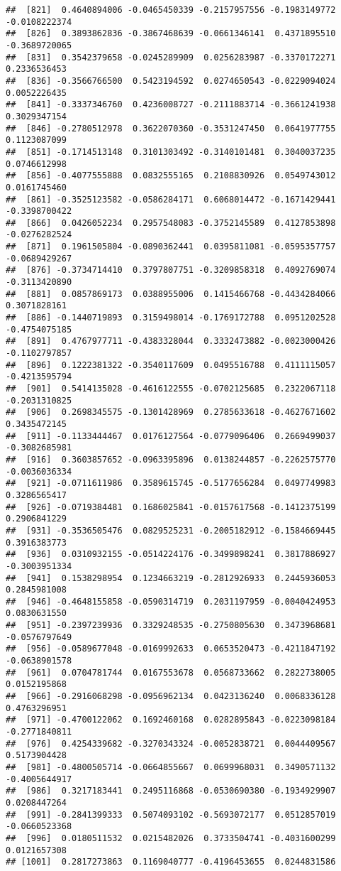 \documentclass[
]{article}
\begin{document}
\begin{verbatim}
##  [821]  0.4640894006 -0.0465450339 -0.2157957556 -0.1983149772 -0.0108222374
##  [826]  0.3893862836 -0.3867468639 -0.0661346141  0.4371895510 -0.3689720065
##  [831]  0.3542379658 -0.0245289909  0.0256283987 -0.3370172271  0.2336536453
##  [836] -0.3566766500  0.5423194592  0.0274650543 -0.0229094024  0.0052226435
##  [841] -0.3337346760  0.4236008727 -0.2111883714 -0.3661241938  0.3029347154
##  [846] -0.2780512978  0.3622070360 -0.3531247450  0.0641977755  0.1123087099
##  [851] -0.1714513148  0.3101303492 -0.3140101481  0.3040037235  0.0746612998
##  [856] -0.4077555888  0.0832555165  0.2108830926  0.0549743012  0.0161745460
##  [861] -0.3525123582 -0.0586284171  0.6068014472 -0.1671429441 -0.3398700422
##  [866]  0.0426052234  0.2957548083 -0.3752145589  0.4127853898 -0.0276282524
##  [871]  0.1961505804 -0.0890362441  0.0395811081 -0.0595357757 -0.0689429267
##  [876] -0.3734714410  0.3797807751 -0.3209858318  0.4092769074 -0.3113420890
##  [881]  0.0857869173  0.0388955006  0.1415466768 -0.4434284066  0.3071828161
##  [886] -0.1440719893  0.3159498014 -0.1769172788  0.0951202528 -0.4754075185
##  [891]  0.4767977711 -0.4383328044  0.3332473882 -0.0023000426 -0.1102797857
##  [896]  0.1222381322 -0.3540117609  0.0495516788  0.4111115057 -0.4213595794
##  [901]  0.5414135028 -0.4616122555 -0.0702125685  0.2322067118 -0.2031310825
##  [906]  0.2698345575 -0.1301428969  0.2785633618 -0.4627671602  0.3435472145
##  [911] -0.1133444467  0.0176127564 -0.0779096406  0.2669499037 -0.3082685981
##  [916]  0.3603857652 -0.0963395896  0.0138244857 -0.2262575770 -0.0036036334
##  [921] -0.0711611986  0.3589615745 -0.5177656284  0.0497749983  0.3286565417
##  [926] -0.0719384481  0.1686025841 -0.0157617568 -0.1412375199  0.2906841229
##  [931] -0.3536505476  0.0829525231 -0.2005182912 -0.1584669445  0.3916383773
##  [936]  0.0310932155 -0.0514224176 -0.3499898241  0.3817886927 -0.3003951334
##  [941]  0.1538298954  0.1234663219 -0.2812926933  0.2445936053  0.2845981008
##  [946] -0.4648155858 -0.0590314719  0.2031197959 -0.0040424953  0.0830631550
##  [951] -0.2397239936  0.3329248535 -0.2750805630  0.3473968681 -0.0576797649
##  [956] -0.0589677048 -0.0169992633  0.0653520473 -0.4211847192 -0.0638901578
##  [961]  0.0704781744  0.0167553678  0.0568733662  0.2822738005  0.0152195868
##  [966] -0.2916068298 -0.0956962134  0.0423136240  0.0068336128  0.4763296951
##  [971] -0.4700122062  0.1692460168  0.0282895843 -0.0223098184 -0.2771840811
##  [976]  0.4254339682 -0.3270343324 -0.0052838721  0.0044409567  0.5173904428
##  [981] -0.4800505714 -0.0664855667  0.0699968031  0.3490571132 -0.4005644917
##  [986]  0.3217183441  0.2495116868 -0.0530690380 -0.1934929907  0.0208447264
##  [991] -0.2841399333  0.5074093102 -0.5693072177  0.0512857019 -0.0660523368
##  [996]  0.0180511532  0.0215482026  0.3733504741 -0.4031600299  0.0121657308
## [1001]  0.2817273863  0.1169040777 -0.4196453655  0.0244831586
\end{verbatim}
\end{document}
